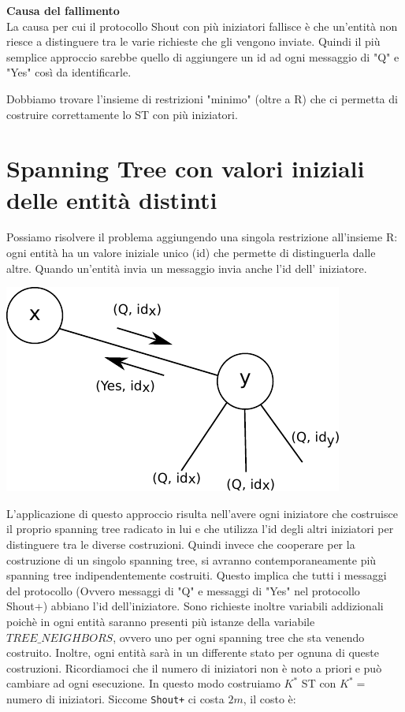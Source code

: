 \textbf{Causa del fallimento}\\
La causa per cui il protocollo Shout con più iniziatori fallisce è che un'entità non riesce a distinguere tra le varie richieste che gli vengono inviate. Quindi il più semplice approccio sarebbe quello di aggiungere un id ad ogni messaggio di "Q" e "Yes" così da identificarle.

Dobbiamo trovare l'insieme di restrizioni "minimo" (oltre a R) che ci permetta di costruire correttamente lo ST con più iniziatori.

\section{Spanning Tree con valori iniziali delle entità distinti}
Possiamo risolvere il problema aggiungendo una singola restrizione all'insieme R: ogni entità ha un valore iniziale unico (id) che permette di distinguerla dalle altre.
Quando un'entità invia un messaggio invia anche l'id dell' iniziatore.
\begin{center}
  \includegraphics[scale=0.8]{images/n_38}
\end{center}
L'applicazione di questo approccio risulta nell'avere ogni iniziatore che costruisce il proprio spanning tree radicato in lui e che utilizza l'id degli altri iniziatori per distinguere tra le diverse costruzioni. Quindi invece che cooperare per la costruzione di un singolo spanning tree, si avranno contemporaneamente più spanning tree indipendentemente costruiti. Questo implica che  tutti i messaggi del protocollo (Ovvero messaggi di "Q" e messaggi di "Yes" nel protocollo Shout+) abbiano l'id dell'iniziatore. Sono richieste inoltre variabili addizionali poichè in ogni entità saranno presenti più istanze della variabile $TREE\_NEIGHBORS$, ovvero uno per ogni spanning tree che sta venendo costruito. Inoltre, ogni entità sarà in un differente stato per ognuna di queste costruzioni. Ricordiamoci che il numero di iniziatori non è noto a priori e può cambiare ad ogni esecuzione.
In questo modo costruiamo $K^*$ ST con $K^*=$ numero di iniziatori. Siccome \texttt{Shout+} ci costa $2m$, il costo è:

